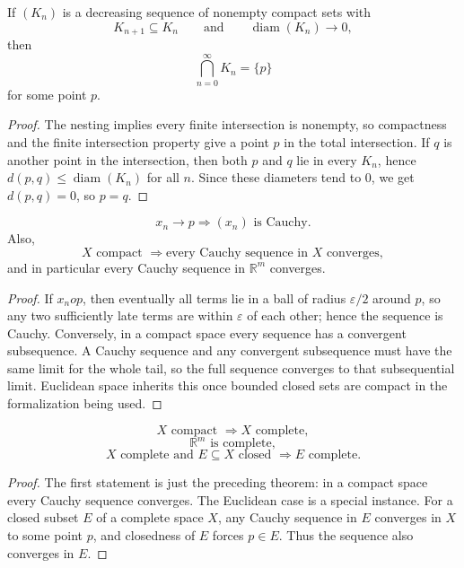 \begin{theorem}
\label{thm:nested-compact-intersection}
If $(K_n)$ is a decreasing sequence of nonempty compact sets with
\[
K_{n+1}\subseteq K_n
\qquad\text{and}\qquad
\operatorname{diam}(K_n)\to 0,
\]
then
\[
\bigcap_{n=0}^\infty K_n=\{p\}
\]
for some point $p$.
\begin{proof}
The nesting implies every finite intersection is nonempty, so compactness and the finite
intersection property give a point $p$ in the total intersection. If $q$ is another point in the
intersection, then both $p$ and $q$ lie in every $K_n$, hence $d(p,q)\le\operatorname{diam}(K_n)$
for all $n$. Since these diameters tend to $0$, we get $d(p,q)=0$, so $p=q$.
\end{proof}
\end{theorem}

\begin{theorem}
\label{thm:cauchy-convergence-results}
\[
x_n \to p \Longrightarrow (x_n)\text{ is Cauchy}.
\]
Also,
\[
X \text{ compact } \Longrightarrow \text{every Cauchy sequence in }X\text{ converges},
\]
and in particular every Cauchy sequence in $\mathbb{R}^m$ converges.
\begin{proof}
If $x_n	o p$, then eventually all terms lie in a ball of radius $\varepsilon/2$ around $p$, so
any two sufficiently late terms are within $\varepsilon$ of each other; hence the sequence is
Cauchy. Conversely, in a compact space every sequence has a convergent subsequence. A Cauchy
sequence and any convergent subsequence must have the same limit for the whole tail, so the full
sequence converges to that subsequential limit. Euclidean space inherits this once bounded closed
sets are compact in the formalization being used.
\end{proof}
\end{theorem}

\begin{theorem}
\label{thm:completeness-results}
\[
X \text{ compact } \Longrightarrow X \text{ complete},
\]
\[
\mathbb{R}^m \text{ is complete},
\]
\[
X \text{ complete and } E \subseteq X \text{ closed } \Longrightarrow E \text{ complete}.
\]
\begin{proof}
The first statement is just the preceding theorem: in a compact space every Cauchy sequence
converges. The Euclidean case is a special instance. For a closed subset $E$ of a complete
space $X$, any Cauchy sequence in $E$ converges in $X$ to some point $p$, and closedness of $E$
forces $p\in E$. Thus the sequence also converges in $E$.
\end{proof}
\end{theorem}

